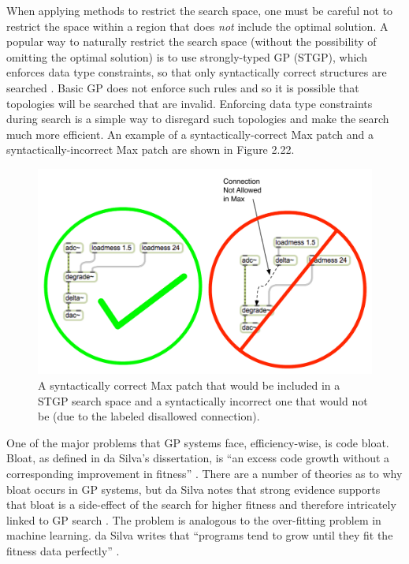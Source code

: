 \documentclass[a4paper,12pt]{report} 	%
\numberwithin{figure}{chapter}
\numberwithin{table}{chapter}
\numberwithin{equation}{chapter}
\begin{document}
\begin{flushleft}
When applying methods to restrict the search space, one must be careful not to restrict the space within a region that does \emph{not} include the optimal solution. A popular way to naturally restrict the search space (without the possibility of omitting the optimal solution) is to use strongly-typed GP (STGP), which enforces data type constraints, so that only syntactically correct structures are searched  \cite{Vanneschi:2004le, Harris:1997qf, Pachet:2007if}. Basic GP does not enforce such rules and so it is possible that topologies will be searched that are invalid. Enforcing data type constraints during search is a simple way to disregard such topologies and make the search much more efficient. An example of a syntactically-correct Max patch and a syntactically-incorrect Max patch are shown in Figure 2.22.
\\
\begin{figure}[h!]
\begin{center}
\includegraphics[scale=0.70]{SyntacticCorrectness}
\caption[Strongly-Typed Genetic Programming]{A syntactically correct Max patch that would be included in a STGP search space and a syntactically incorrect one that would not be (due to the labeled disallowed connection).}
\end{center}
\end{figure}
One of the major problems that GP systems face, efficiency-wise, is code bloat. Bloat, as defined in da Silva's dissertation, is ``an excess code growth without a corresponding improvement in fitness'' \cite[p. 2]{Silva:2008le}. There are a number of theories as to why bloat occurs in GP systems, but da Silva notes that strong evidence supports that bloat is a side-effect of the search for higher fitness and therefore intricately linked to GP search \cite[p. 9]{Silva:2008le}. The problem is analogous to the over-fitting problem in machine learning. da Silva writes that ``programs tend to grow until they fit the fitness data perfectly'' \cite[p. 9]{Silva:2008le}.


\end{flushleft}
\end{document}
